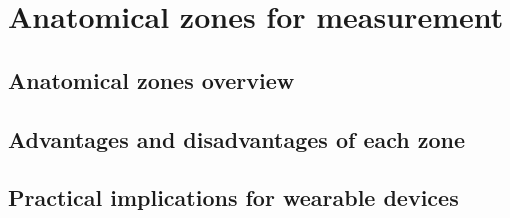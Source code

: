 
\chapter{Anatomical zones for measurement}
\label{cha:Anatomical zones for measurement}

\section{Anatomical zones overview}
\label{sec:Anatomical zones overview}

\section{Advantages and disadvantages of each zone}
\label{sec:Advantages and disadvantages of each zone}

\section{Practical implications for wearable devices}
\label{sec:Practical implications for wearable devices}